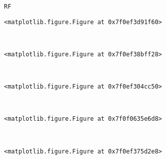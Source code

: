\documentclass[11pt]{article}
\begin{document}
    \begin{Verbatim}[commandchars=\\\{\}]
RF

    \end{Verbatim}

    
    \begin{verbatim}
<matplotlib.figure.Figure at 0x7f0ef3d91f60>
    \end{verbatim}

    
    \begin{center}
    \end{center}
    { \hspace*{\fill} \\}
    
    
    \begin{verbatim}
<matplotlib.figure.Figure at 0x7f0ef38bff28>
    \end{verbatim}

    
    \begin{center}
    \end{center}
    { \hspace*{\fill} \\}
    
    
    \begin{verbatim}
<matplotlib.figure.Figure at 0x7f0ef304cc50>
    \end{verbatim}

    
    \begin{center}
    \end{center}
    { \hspace*{\fill} \\}
    
    
    \begin{verbatim}
<matplotlib.figure.Figure at 0x7f0f0635e6d8>
    \end{verbatim}

    
    \begin{center}
    \end{center}
    { \hspace*{\fill} \\}
    
    
    \begin{verbatim}
<matplotlib.figure.Figure at 0x7f0ef375d2e8>
    \end{verbatim}
\end{document}

